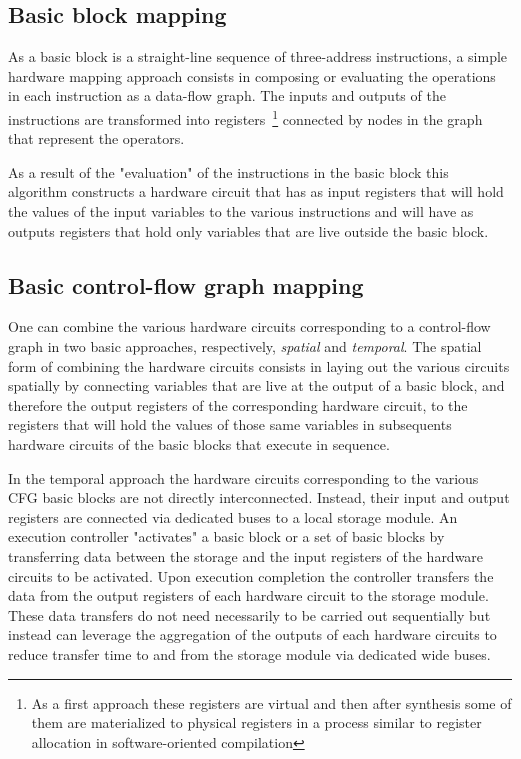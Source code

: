 \subsection{Basic block mapping}
As a basic block is a straight-line sequence of three-address instructions, a simple hardware mapping approach consists in composing or evaluating the operations in each instruction as a data-flow graph. 
The inputs and outputs of the instructions are transformed into registers~\footnote{As a first approach these registers are virtual and then after synthesis some of them are materialized to physical registers in a process similar to register allocation in software-oriented compilation}  connected by nodes in the graph that represent the operators. 

As a result of the "evaluation" of the instructions in the basic block this algorithm constructs a hardware circuit that has as input registers that will hold the values of the input variables to the various instructions and will have as outputs registers that hold only variables that are live outside the basic block. 


\subsection{Basic control-flow graph mapping}
\label{sec:cfg_mapping}
One can combine the various hardware circuits corresponding to a control-flow graph in two basic approaches, respectively, {\em spatial} and {\em temporal}. 
The spatial form of combining the hardware circuits consists in laying out the various circuits spatially by connecting variables that are live at the output of a basic block, and therefore the output registers of the corresponding hardware circuit, to the registers that will hold the values of those same variables in subsequents hardware circuits of the basic blocks that execute in sequence.

In the temporal approach the hardware circuits corresponding to the various CFG basic blocks are not directly interconnected. 
Instead, their input and output registers are connected via dedicated buses to a local storage module. 
An execution controller "activates" a basic block or a set of basic blocks by transferring data between the storage and the input registers of the hardware circuits to be activated. 
Upon execution completion the controller transfers the data from the output registers of each hardware circuit to the storage module. 
These data transfers do not need necessarily to be carried out sequentially but instead can leverage the aggregation of the outputs of each hardware circuits to reduce transfer time to and from the storage module via dedicated wide buses.

